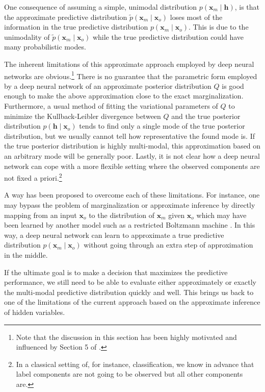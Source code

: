 \documentclass[dissertation,nocontribution]{aaltoseries}
\newcommand{\vect}[1]{\mathbf{#1}}
\newcommand{\vh}[0]{\vect{h}}
\newcommand{\vx}[0]{\vect{x}}
\begin{document}
One consequence of 
assuming a simple, unimodal distribution $p(\vx_m \mid \vh)$, 
is that the
approximate predictive distribution $\tilde{p}(\vx_m \mid
\vx_o)$ loses most of the information in the true predictive
distribution $p(\vx_m \mid \vx_o)$. This is due to the
unimodality of 
$\tilde{p}(\vx_m \mid \vx_o)$ 
while the true
predictive distribution could have many probabilistic modes.

The inherent limitations of this approximate approach
employed by deep neural networks are obvious.\footnote{Note
that the discussion in this section has been highly
motivated and influenced by Section 5 of
\citep{Bengio2013future}.} There is no guarantee that the
parametric form employed by a deep neural network of an
approximate posterior distribution $Q$ is good enough to
make the above approximation close to the exact
marginalization.  Furthermore, a usual method of fitting the
variational parameters of $Q$ to minimize the
Kullback-Leibler divergence between $Q$ and the true
posterior distribution $p(\vh \mid \vx_o)$ tends to find
only a single mode of the true posterior distribution, but
we usually cannot tell how representative the found mode is.
If the true posterior distribution is highly multi-modal,
this approximation based on an arbitrary mode will be
generally poor.  Lastly, it is not clear how a deep neural
network can cope with a more flexible setting where the
observed components are not fixed a priori.\footnote{In a
classical setting of, for instance, classification, we know
in advance that label components are not going to be
observed but all other components are.}

A way has been proposed to overcome each of these
limitations. For instance, one may bypass the problem of
marginalization or approximate inference by directly mapping
from an input $\vx_o$ to the distribution of $\vx_m$ given
$\vx_o$ which may have been learned by another model such as
a restricted Boltzmann machine \citep{Mnih2011}. In this
way, a deep neural network can learn to approximate a true
predictive distribution $p(\vx_m \mid \vx_o)$ without going
through an extra step of approximation in the middle.

If the ultimate goal is to make a decision that maximizes the
predictive performance, we still need to be able to evaluate
either approximately or exactly the multi-modal predictive
distribution quickly and well. This brings us back to one of the
limitations of the current approach based on the approximate
inference of hidden variables.
\end{document}

